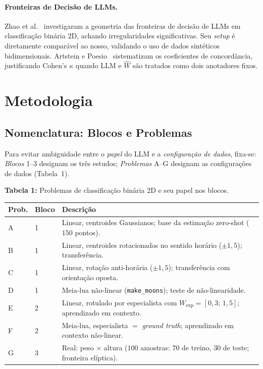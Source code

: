 \documentclass[12pt,a4paper]{article}
\newcommand{\West}{\ensuremath{\hat{W}}}   %
\begin{document}
\paragraph{Fronteiras de Decisão de LLMs.}
Zhao et al.~\cite{zhaoProbing2024} investigaram a geometria das fronteiras de decisão de LLMs
em classificação binária $2$D, achando irregularidades significativas. Seu \emph{setup} é
diretamente comparável ao nosso, validando o uso de dados sintéticos bidimensionais.
Artstein e Poesio~\cite{artsteinInterCoder2008} sistematizam os coeficientes de concordância,
justificando Cohen's $\kappa$ quando LLM e \West{} são tratados como dois anotadores fixos.

\section{Metodologia}
\label{sec:metodologia}

\subsection{Nomenclatura: Blocos e Problemas}

Para evitar ambiguidade entre o \emph{papel} do LLM e a \emph{configuração de dados},
fixa-se: \emph{Blocos} 1–3 designam os três estudos; \emph{Problemas} A–G designam as
configurações de dados (Tabela~1).


\bigskip

\noindent \textbf{Tabela 1:} Problemas de classificação binária $2$D e seu papel nos blocos.

\begin{tabular}{llp{7.8cm}}
\toprule
\textbf{Prob.} & \textbf{Bloco} & \textbf{Descrição} \\
\midrule
A & 1 & Linear, centroides Gaussianos; base da estimação zero-shot ($150$ pontos). \\
B & 1 & Linear, centroides rotacionados no sentido horário ($\pm 1{,}5$); transferência. \\
C & 1 & Linear, rotação anti-horária ($\pm 1{,}5$); transferência com orientação oposta. \\
D & 1 & Meia-lua não-linear (\texttt{make\_moons}); teste de não-linearidade. \\
E & 2 & Linear, rotulado por especialista com $W_{\text{exp}}=[0{,}3;\,1{,}5]$;
  aprendizado em contexto. \\
F & 2 & Meia-lua, especialista $=$ \emph{ground truth}; aprendizado em contexto
  não-linear. \\
G & 3 & Real: peso $\times$ altura ($100$ amostras: $70$ de treino, $30$ de teste;
  fronteira elíptica). \\
\bottomrule
\end{tabular}
\end{document}
